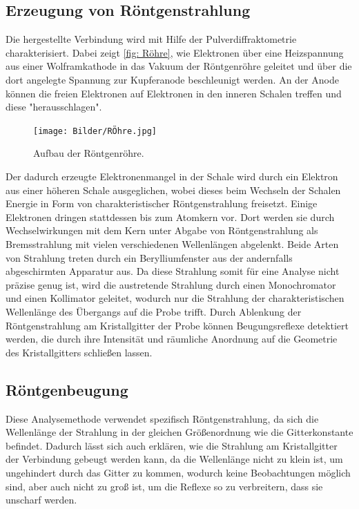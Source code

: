 \documentclass[a4paper,12pt,bibliography=totocnumbered]{scrartcl}
\begin{document}
\subsection{Erzeugung von Röntgenstrahlung}
Die hergestellte Verbindung wird mit Hilfe der Pulverdiffraktometrie charakterisiert.
Dabei zeigt \autoref{fig: Röhre}, wie Elektronen über eine Heizspannung aus einer Wolframkathode in das Vakuum der Röntgenröhre geleitet und über die dort angelegte Spannung zur Kupferanode beschleunigt werden.
An der Anode können die freien Elektronen auf Elektronen in den inneren Schalen treffen und diese "herausschlagen".
\begin{figure}[H]
    \centering
    \texttt{[image: Bilder/RÖhre.jpg]}
    \caption{Aufbau der Röntgenröhre. \cite{Kristallgitter}}
    \label{fig: Röhre}
\end{figure}
Der dadurch erzeugte Elektronenmangel in der Schale wird durch ein Elektron aus einer höheren Schale ausgeglichen, wobei dieses beim Wechseln der Schalen Energie in Form von charakteristischer Röntgenstrahlung freisetzt. 
Einige Elektronen dringen stattdessen bis zum Atomkern vor. 
Dort werden sie durch Wechselwirkungen mit dem Kern unter Abgabe von Röntgenstrahlung als Bremsstrahlung mit vielen verschiedenen Wellenlängen abgelenkt.
Beide Arten von Strahlung treten durch ein Berylliumfenster aus der andernfalls abgeschirmten Apparatur aus. 
\newpage
Da diese Strahlung somit für eine Analyse nicht präzise genug ist, wird die austretende Strahlung durch einen Monochromator und einen Kollimator geleitet, wodurch nur die Strahlung der charakteristischen Wellenlänge des Übergangs auf die Probe trifft. 
Durch Ablenkung der Röntgenstrahlung am Kristallgitter der Probe können Beugungsreflexe detektiert werden, die durch ihre Intensität und räumliche Anordnung auf die Geometrie des Kristallgitters schließen lassen.

\subsection{Röntgenbeugung}
Diese Analysemethode verwendet spezifisch Röntgenstrahlung, da sich die Wellenlänge der Strahlung in der gleichen Größenordnung wie die Gitterkonstante befindet. \cite{Kristallgitter}
Dadurch lässt sich auch erklären, wie die Strahlung am Kristallgitter der Verbindung gebeugt werden kann, da die Wellenlänge nicht zu klein ist, um ungehindert durch das Gitter zu kommen, wodurch keine Beobachtungen möglich sind, aber auch nicht zu groß ist, um die Reflexe so zu verbreitern, dass sie unscharf werden.
\end{document}
